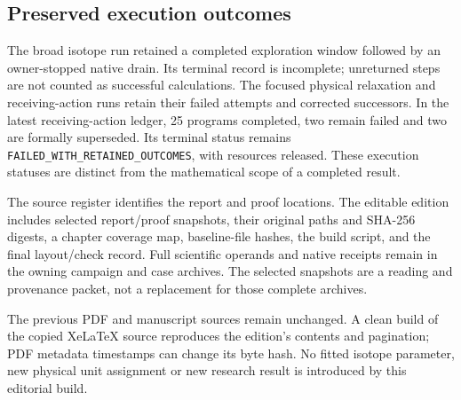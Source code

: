 \subsection{Preserved execution outcomes}

The broad isotope run retained a completed exploration window followed by
an owner-stopped native drain. Its terminal record is incomplete; unreturned
steps are not counted as successful calculations. The focused physical
relaxation and receiving-action runs retain their failed attempts and
corrected successors. In the latest receiving-action ledger, 25 programs
completed, two remain failed and two are formally superseded. Its terminal
status remains \texttt{FAILED\_WITH\_RETAINED\_OUTCOMES}, with resources
released. These execution statuses are distinct from the mathematical
scope of a completed result.

The source register identifies the report and proof locations. The editable
edition includes selected report/proof snapshots, their original paths and
SHA-256 digests, a chapter coverage map, baseline-file hashes, the build
script, and the final layout/check record. Full scientific operands and
native receipts remain in the owning campaign and case archives. The
selected snapshots are a reading and provenance packet, not a replacement
for those complete archives.

The previous PDF and manuscript sources remain unchanged. A clean build
of the copied XeLaTeX source reproduces the edition's contents and
pagination; PDF metadata timestamps can change its byte hash. No fitted
isotope parameter, new physical unit assignment or new research result is
introduced by this editorial build.

